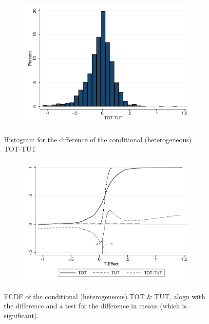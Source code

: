 \documentclass[oneside,11pt]{article}
\begin{document}
\begin{figure}[H]
     \caption{TOT-TUT Histogram}
    \label{}
    \begin{center}
    \begin{subfigure}{0.75\textwidth}
        \centering
        \includegraphics[width=\textwidth]{Figuras/dif_tot_tut.pdf}
    \end{subfigure}
    \end{center}
    \scriptsize
        Histogram for the difference of the conditional (heterogeneous) TOT-TUT
\end{figure}


\begin{figure}[H]
     \caption{TOT-TUT CDF}
    \label{ExplanatoryMaterial}
    \begin{center}
    \begin{subfigure}{0.75\textwidth}
        \centering
        \includegraphics[width=\textwidth]{Figuras/cdf_tot_tut.pdf}
    \end{subfigure}
    \end{center}
    \scriptsize
        ECDF of the conditional (heterogeneous) TOT \& TUT, alogn with the difference and a test for the difference in means (which is significant).
\end{figure}
\end{document}
